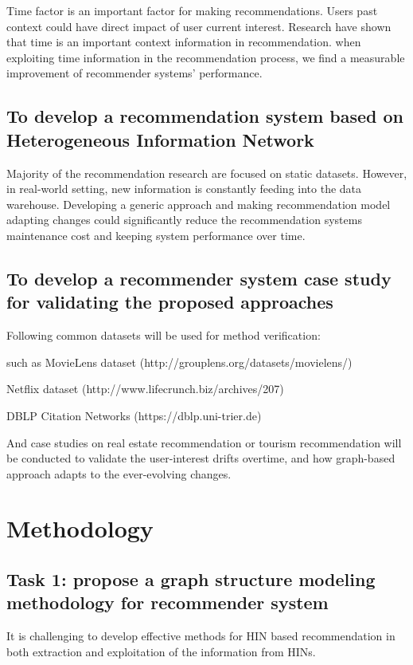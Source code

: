 \documentclass[12pt,a4 paper,title page]{article}
\begin{document}
Time factor is an important factor for making recommendations. Users past context could have direct impact of user current interest. Research have shown that time is an important context information in recommendation. when exploiting time information in the recommendation process, we find a measurable improvement of recommender systems’ performance. 

\subsection{To develop a recommendation system based on Heterogeneous Information Network} 

Majority of the recommendation research are focused on static datasets. However, in real-world setting, new information is constantly feeding into the data warehouse. Developing a generic approach and making recommendation model adapting changes could significantly reduce the recommendation systems maintenance cost and keeping system performance over time. 

\subsection{To develop a recommender system case study for validating the proposed approaches}

Following common datasets will be used for method verification: 

such as MovieLens dataset (http://grouplens.org/datasets/movielens/) 

Netflix dataset (http://www.lifecrunch.biz/archives/207) 

DBLP Citation Networks (https://dblp.uni-trier.de)  

And case studies on real estate recommendation or tourism recommendation will be conducted to validate the user-interest drifts overtime, and how graph-based approach adapts to the ever-evolving changes. 

\section{Methodology}


\subsection{Task 1: propose a graph structure modeling methodology for recommender system}
It is challenging to develop effective methods for HIN based recommendation in both extraction and exploitation of the information from HINs.
\end{document}
